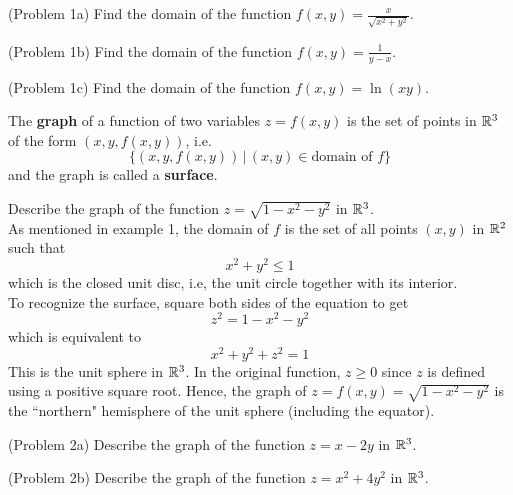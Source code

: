 \documentclass[handout]{ximera}
\begin{document}
\begin{problem}(Problem 1a)
Find the domain of the function $f(x, y) = \frac{x}{\sqrt{x^2 + y^2}}$.\\
\end{problem}

\begin{problem}(Problem 1b)
Find the domain of the function $f(x, y) = \frac{1}{y - x}$.\\
\end{problem}

\begin{problem}(Problem 1c)
Find the domain of the function $f(x, y) = \ln(xy)$.\\
\end{problem}


The \textbf{graph} of a function of two variables $z = f(x, y)$ is the 
set of points in $\mathbb R^3$ of the form $(x, y, f(x,y))$, i.e.
\[
\{(x, y, f(x,y)) \,|\, (x, y) \in \text{domain of } f\}
\]
and the graph is called a \textbf{surface}.



\begin{example}[Example 2]
Describe the graph of the function $z = \sqrt{1 - x^2 - y^2}$ in $\mathbb R^3$.\\
As mentioned in example 1, the domain of $f$ is the set of all points $(x, y)$ 
in $\mathbb R^2$ such that
\[
x^2 + y^2 \leq 1
\]
which is the closed unit disc, i.e, the unit circle together with its interior.\\
To recognize the surface, square both sides of the equation to get
\[
z^2 = 1 - x^2 - y^2
\]
which is equivalent to
\[
x^2 + y^2 + z^2 = 1
\]
This is the unit sphere in $\mathbb R^3$. In the original function, $z\geq 0$ since $z$ is 
defined using a positive square root. 
Hence, the graph of $z = f(x, y) = \sqrt{1 - x^2 - y^2}$ is the ``northern" hemisphere 
of the unit sphere (including the equator).
\end{example}



\begin{problem}(Problem 2a)
Describe the graph of the function $z = x - 2y$ in $\mathbb R^3$.\\
\end{problem}

\begin{problem}(Problem 2b)
Describe the graph of the function $z = x^2 + 4y^2$ in $\mathbb R^3$.\\
\end{problem}
\end{document}
